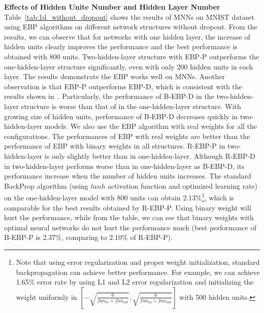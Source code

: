 \documentclass{article} %
\begin{document}
\textbf{Effects of Hidden Unite Number and Hidden Layer Number} Table~\ref{tab:1d_without_dropout} shows the results of MNNs on MNIST dataset using EBP algorithms on different network structures without dropout. From the results, we can observe that for networks with one hidden layer, the increase of hidden units clearly improves the performance and the best performance is obtained with 800 units. Two-hidden-layer structure with EBP-P outperforms the one-hidden-layer structure significantly, even with only 200 hidden units in each layer. The results demonstrate the EBP works well on MNNs. Another observation is that EBP-P outperforms EBP-D, which is consistent with the results shown in~\citet{Soudry14}. Particularly, the performance of B-EBP-D in the two-hidden-layer structure is worse than that of in the one-hidden-layer structure. With growing size of hidden units, performance of B-EBP-D decreases quickly in two-hidden-layer models. We also use the EBP algorithm with real weights for all the configurations. The performances of EBP with real weights are better than the performance of EBP with binary weights in all structures. R-EBP-P in two-hidden-layer is only slightly better than  in one-hidden-layer. Although R-EBP-D in two-hidden-layer performs worse than in one-hidden-layer as B-EBP-D, its performance increase  when the number of hidden units increases. The standard BackProp algorithm (using $tanh$ activation function and optimized learning rate) on the one-hidden-layer model with 800 units can obtain 2.13\%\footnote{Note that using error regularization and proper weight initialization, standard backpropagation can achieve better performance. For example, we can achieve 1.65\% error rate by using L1 and L2 error regularization and initializing the weight uniformly in $[-\sqrt{\frac{6}{fan_{in}+fan_{out}}}, \sqrt{\frac{6}{fan_{in}+fan_{out}}}]$ with 500 hidden units.}, which is comparable for the best results obtained by R-EBP-P. Using binary weight will hurt the performance, while from the table, we can see that binary weights with optimal neural networks do not hurt the performance much (best performance of B-EBP-P is 2.37\%, comparing to 2.10\% of R-EBP-P).
\end{document}
